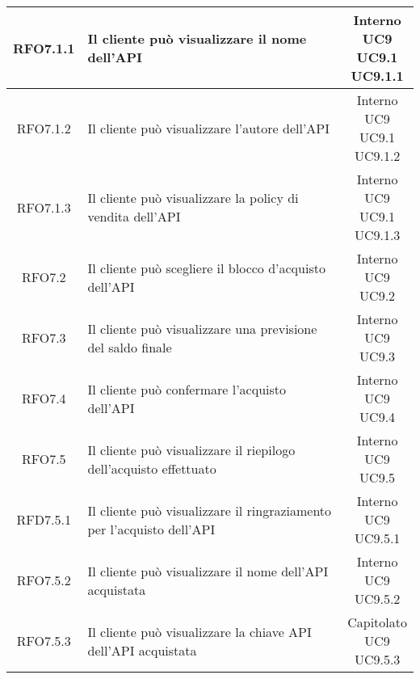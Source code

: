 \begin{longtable}{|c|p{8cm}|c|}
\hypertarget{RFO7.1.1}{RFO7.1.1} & Il cliente può visualizzare il nome dell'API & \makecell*{Interno\\UC9\\UC9.1\\UC9.1.1} \\
\hline
\hypertarget{RFO7.1.2}{RFO7.1.2} & Il cliente può visualizzare l'autore dell'API & \makecell*{Interno\\UC9\\UC9.1\\UC9.1.2} \\
\hline
\hypertarget{RFO7.1.3}{RFO7.1.3} & Il cliente può visualizzare la policy di vendita dell'API & \makecell*{Interno\\UC9\\UC9.1\\UC9.1.3} \\
\hline

\hypertarget{RFO7.2}{RFO7.2} & Il cliente può scegliere il blocco d'acquisto dell'API & \makecell*{Interno\\UC9\\UC9.2} \\
\hline
\hypertarget{RFO7.3}{RFO7.3} & Il cliente può visualizzare una previsione del saldo finale & \makecell*{Interno\\UC9\\UC9.3} \\
\hline

\hypertarget{RFO7.4}{RFO7.4} & Il cliente può confermare l'acquisto dell'API & \makecell*{Interno\\UC9\\UC9.4} \\
\hline

\hypertarget{RFO7.5}{RFO7.5} & Il cliente può visualizzare il riepilogo dell'acquisto effettuato & \makecell*{Interno\\UC9\\UC9.5} \\
\hline

\hypertarget{RFD7.5.1}{RFD7.5.1} & Il cliente può visualizzare il ringraziamento per l'acquisto dell'API & \makecell*{Interno\\UC9\\UC9.5.1} \\
\hline
\hypertarget{RFO7.5.2}{RFO7.5.2} & Il cliente può visualizzare il nome dell'API acquistata & \makecell*{Interno\\UC9\\UC9.5.2} \\
\hline
\hypertarget{RFO7.5.3}{RFO7.5.3} & Il cliente può visualizzare la chiave API dell'API acquistata & \makecell*{Capitolato\\UC9\\UC9.5.3} \\
\hline


\end{longtable}

